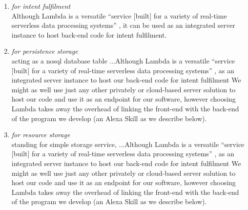 \begin{enumerate}
%	
	

	\item[\href{https://aws.amazon.com/lambda/}{\textbf{Lambda}} \footnote{\url{https://aws.amazon.com/lambda}}] \textit{for intent fulfilment}\\
	Although Lambda is a versatile ``service [built] for a variety of real-time serverless data processing systems'' \cite{aws_website}, it can be used as an integrated server instance to host back-end code for intent fulfilment. %

	
%	
%




\item[\href{https://aws.amazon.com/dynamodb/}{\textbf{DynamoDB}} \footnote{\url{https://aws.amazon.com/dynamodb}}] \textit{for persistence storage}\\
acting as a nosql database table ...Although Lambda is a versatile ``service [built] for a variety of real-time serverless data processing systems'' \cite{aws_website},  as an integrated server instance to host our back-end code for intent fulfilment%
We might as well use just any other privately or cloud-based server solution to host our code and use it as an endpoint for our software, however choosing Lambda takes away the overhead of linking the front-end with the back-end of the program we develop (an Alexa Skill as we describe below). 



\item[\href{https://aws.amazon.com/s3/}{\textbf{S3}} \footnote{\url{https://aws.amazon.com/s3}}] \textit{for resource storage}\\
standing for simple storage service, ...Although Lambda is a versatile ``service [built] for a variety of real-time serverless data processing systems'' \cite{aws_website},  as an integrated server instance to host our back-end code for intent fulfilment%
We might as well use just any other privately or cloud-based server solution to host our code and use it as an endpoint for our software, however choosing Lambda takes away the overhead of linking the front-end with the back-end of the program we develop (an Alexa Skill as we describe below). 



\end{enumerate}
